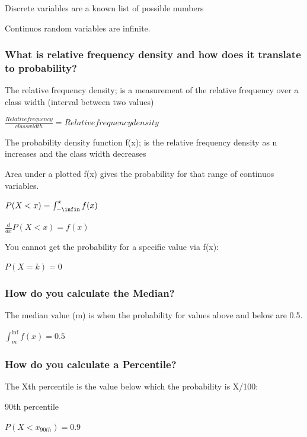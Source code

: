 \documentclass[
]{article}
\begin{document}
Discrete variables are a known list of possible numbers

Continuos random variables are infinite.

\hypertarget{what-is-relative-frequency-density-and-how-does-it-translate-to-probability}{%
\subsubsection{What is relative frequency density and how does it
translate to
probability?}\label{what-is-relative-frequency-density-and-how-does-it-translate-to-probability}}

The relative frequency density; is a measurement of the relative
frequency over a class width (interval between two values)

\(\frac{Relative frequency}{class width} = Relative frequency density\)

The probability density function f(x); is the relative frequency density
as n increases and the class width decreases

Area under a plotted f(x) gives the probability for that range of
continuos variables.

\(P(X<x) = \int_{-\infin}^{x} f(x)\)

\(\frac{d}{dx}P(X<x) = f(x)\)

You cannot get the probability for a specific value via f(x):

\(P(X=k) = 0\)

\hypertarget{how-do-you-calculate-the-median}{%
\subsubsection{How do you calculate the
Median?}\label{how-do-you-calculate-the-median}}

The median value (m) is when the probability for values above and below
are 0.5.

\(\int_{m}^{\inf} f(x) = 0.5\)

\hypertarget{how-do-you-calculate-a-percentile}{%
\subsubsection{How do you calculate a
Percentile?}\label{how-do-you-calculate-a-percentile}}

The Xth percentile is the value below which the probability is X/100:

90th percentile

\(P(X<x_{90th}) = 0.9\)
\end{document}
